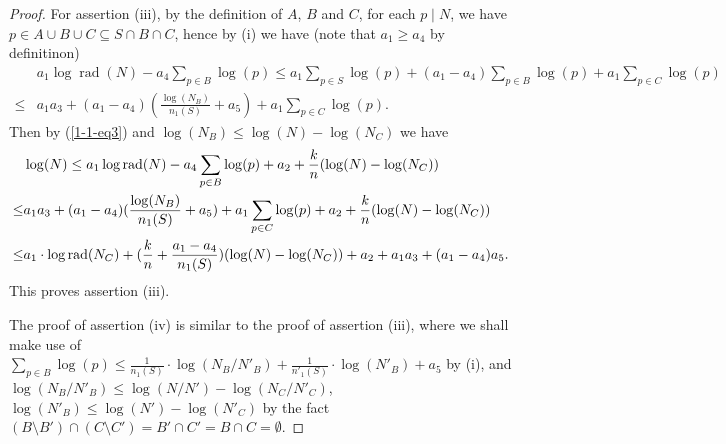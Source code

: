 \documentclass[10pt,a4paper]{amsart}
\DeclareMathOperator{\rad}{\text{rad}}
\begin{document}
\begin{proof}
For assertion (iii), by the definition of $A$, $B$ and $C$, for each $p\mid N$, we have $p\in A\cup B\cup C \subseteq S\cap B \cap C$, hence by (i) we have (note that $a_1\ge a_4$ by definitinon)
\small\begin{align*}
&a_1 \log\rad(N) - a_4  \sum_{p\in B}\log(p) 
\le a_1\sum_{p\in S}\log(p) + (a_1-a_4)\sum_{p\in B}\log(p) + a_1\sum_{p\in C} \log(p)
\\ \le& a_1 a_3 +  (a_1-a_4)(\frac{\log(N_B)}{n_1(S)}  + a_5) + a_1\sum_{p\in C} \log(p).
\end{align*}\normalsize
Then by (\ref{1-1-eq3})  and  $\log(N_B) \le \log(N) - \log(N_C)$   we have  
\begin{equation*} \small
\begin{aligned}
& \log(N) \le   a_1 \log\rad(N) - a_4  \sum_{p\in B}\log(p)  + a_2 + \frac{k}{n}(\log(N) - \log(N_C) )
\\ \le & a_1 a_3 + (a_1-a_4)(\frac{\log(N_B)}{n_1(S)}  + a_5) + a_1\sum_{p\in C} \log(p) + a_2 + \frac{k}{n}(\log(N) - \log(N_C) )
\\ \le& a_1\cdot\log\rad(N_C) + (\frac{k}{n}+ \frac{a_1-a_4}{n_1(S)})(\log(N)-\log(N_C))
+ a_2 + a_1a_3 + (a_1-a_4)a_5 .
\end{aligned}
\end{equation*}
This proves assertion (iii).

The proof of assertion (iv) is similar to the proof of assertion (iii), where we shall make use of $\sum_{p\in B} \log(p) \le \frac{1}{n_1(S)} \cdot \log(N_B/N'_B) +  \frac{1}{n'_1(S)} \cdot \log(N'_B) + a_5$ by (i), and $\log(N_B/N'_B) \le \log(N/N') - \log(N_C/N'_C)$, $\log(N'_B) \le \log(N') - \log(N'_C)$ by the fact $(B\setminus B') \cap (C\setminus C') = B'\cap C' = B \cap C = \emptyset$.
\end{proof}
\end{document}

